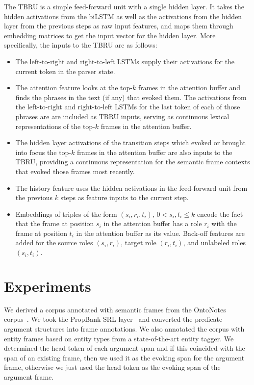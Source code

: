 \documentclass[11pt,a4paper]{article}
\begin{document}
The TBRU is a simple feed-forward unit with a single hidden layer.
It takes the hidden activations from the biLSTM as well as the activations from
the hidden layer from the previous steps as raw input features, and maps them
through embedding matrices to get the input vector for the  hidden layer. More specifically,
the inputs to the TBRU are as follows:

\begin{itemize}
  \item The left-to-right and right-to-left LSTMs supply their activations
  for the current token in the parser state.
  \item The attention feature looks at the top-$k$ frames in the attention buffer
  and finds the phrases in the text (if any) that evoked them. The activations
  from the left-to-right and right-to-left LSTMs for the last token of each of those
  phrases are are included as TBRU inputs, serving as continuous lexical
  representations of the top-$k$ frames in the attention buffer.
  \item The hidden layer activations of the transition steps which evoked or
  brought into focus the top-$k$ frames in the attention buffer are also inputs to the TBRU,
  providing a
  continuous representation for the semantic frame contexts that evoked those frames most recently.
  \item The history feature uses the hidden activations in the feed-forward
  unit from the previous $k$ steps as feature inputs to the current step.
  \item Embeddings of triples of the form $(s_i, r_i, t_i)$, $0<s_i,t_i\le k$ encode the fact that the frame at position $s_i$ in the attention buffer has a role $r_i$ with
  the frame at position $t_i$ in the attention buffer as its value. Back-off
  features are added for the source roles $(s_i,r_i)$, target role $(r_i, t_i)$,
  and unlabeled roles $(s_i,t_i)$. 
\end{itemize}

\section{Experiments}

We derived a corpus annotated with semantic frames from the OntoNotes corpus~\cite{ontonotes2006}. We took the
PropBank SRL layer~\cite{palmer2005} and converted the predicate-argument
structures into frame annotations. We also annotated the corpus with
entity frames based on entity types from a state-of-the-art entity tagger.
We determined the head token of each argument span and if this coincided
with the span of an existing frame, then we used it as the evoking span for the
argument frame, otherwise we just used the head token as the evoking span of the
argument frame.
\end{document}
